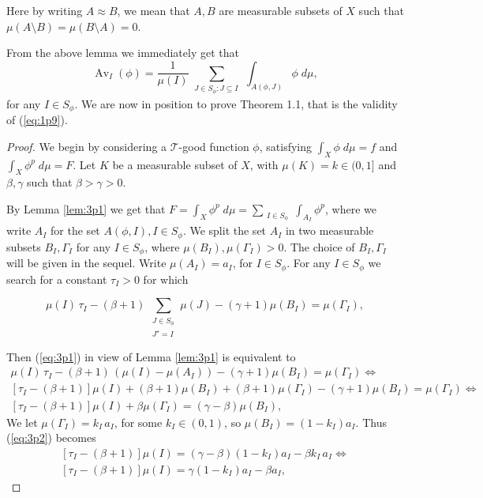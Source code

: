 \documentclass{article}
\numberwithin{equation}{section}
\theoremstyle{definition}
\theoremstyle{remark}
\newcommand{\mc}[1]{\mathcal{#1}}
\DeclareMathOperator{\Av}{Av} %
\begin{document}
Here by writing $A\approx B$, we mean that $A,B$ are measurable subsets of $X$ such that $\mu(A\setminus B)=\mu(B\setminus A)=0$.

From the above lemma we immediately get that
\[
\Av_I(\phi)=\frac{1}{\mu (I)} \sum_{\substack{J\in S_\phi: J\subseteq I\ }} \int_{A(\phi,J)} \phi \; d\mu,
\]
for any $I\in S_{\phi}$. We are now in position to prove Theorem 1.1, that is the validity of (\ref{eq:1p9}).

\begin{proof}
We begin by considering a $\mc T$-good function $\phi$, satisfying $\int_X \phi \; d\mu =f$ and $\int_X \phi^p \; d\mu =F$. Let $K$ be a measurable subset of $X$, with $\mu(K)=k\in (0,1]$ and $\beta,\gamma$ such that $\beta>\gamma>0$.

By Lemma \ref{lem:3p1} we get that $F= \int_X \phi^p \; d\mu = \sum_{\substack{I\in S_\phi}} \int_{A_I}\phi^p$, where we write $A_I$ for the set $A(\phi,I), I\in S_{\phi}$. We split the set $A_I$ in two measurable subsets $B_I,\Gamma_I$ for any $I\in S_{\phi}$, where $\mu \left( B_I \right), \mu \left( \Gamma_I \right)>0$. The choice of $B_I,\Gamma_I$ will be given in the sequel. Write $\mu (A_I)=a_I$, for $I\in S_{\phi}$. For any $I\in S_{\phi}$ we search for a constant $\tau_I>0$ for which

\begin{equation}\label{eq:3p1}
\mu (I) \, \tau_I-(\beta +1)\, \sum_{\substack{J\in S_\phi \\ J^\star=I\ }} \mu(J)- (\gamma +1)\mu(B_I)= \mu (\Gamma_I),
\end{equation}

Then (\ref{eq:3p1}) in view of Lemma \ref{lem:3p1} is equivalent to
\begin{multline} \label{eq:3p2}
\mu (I) \, \tau_I-(\beta +1)\,\left( \mu(I)-\mu(A_I) \right)- (\gamma +1)\mu(B_I)= \mu (\Gamma_I)\Leftrightarrow \\
\left[ \tau_I - (\beta +1) \right]\mu (I)+ (\beta +1)\mu(B_I)+(\beta +1)\mu(\Gamma_I)-(\gamma +1)\mu(B_I)=\mu(\Gamma_I)\Leftrightarrow \\
\left[ \tau_I - (\beta +1) \right]\mu (I)+ \beta\mu(\Gamma_I)=(\gamma-\beta)\mu(B_I),
\end{multline}
We let $\mu(\Gamma_I)=k_I\,a_I$, for some $k_I\in (0,1)$, so $\mu(B_I)=(1-k_I)a_I$. Thus (\ref{eq:3p2}) becomes
\begin{multline} \label{eq:3p3}
\left[ \tau_I - (\beta +1) \right]\mu (I)=(\gamma-\beta)(1-k_I)a_I-\beta k_I\,a_I\Leftrightarrow \\
\left[ \tau_I - (\beta +1) \right]\mu (I)= \gamma(1-k_I)a_I-\beta a_I,
\end{multline}


\end{proof}
\end{document}

